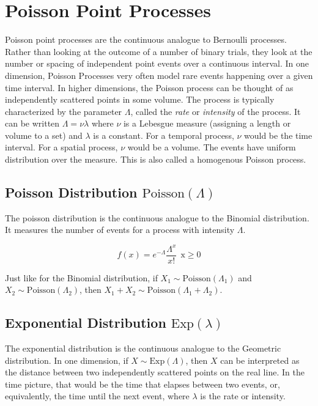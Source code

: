 \section{Poisson Point Processes}
Poisson point processes are the continuous analogue to Bernoulli processes. Rather than looking at the outcome of a number of binary trials, they look at the number or spacing of independent point events over a continuous interval. In one dimension, Poisson Processes very often model rare events happening over a given time interval. In higher dimensions, the Poisson process can be thought of as independently scattered points in some volume. The process is typically characterized by the parameter $\Lambda$, called the \textit{rate} or \textit{intensity} of the process. It can be written $\Lambda = \nu \lambda$ where $\nu$ is a Lebesgue measure (assigning a length or volume to a set) and $\lambda$ is a constant. For a temporal process, $\nu$ would be the time interval. For a spatial process, $\nu$ would be a volume. The events have uniform distribution over the measure. This is also called a homogenous Poisson process. 

\subsection{Poisson Distribution $\mathrm{Poisson}(\Lambda)$}
The poisson distribution is the continuous analogue to the Binomial distribution. It measures the number of events for a process with intensity $\Lambda$.

\begin{equation}
f(x) = e^{-\Lambda}\frac{\Lambda^x}{x!}\ \ \mathrm{x\geq0}
\end{equation}

Just like for the Binomial distribution, if $X_1 \sim \mathrm{Poisson}(\Lambda_1)$ and $X_2 \sim \mathrm{Poisson}(\Lambda_2)$, then $X_1 + X_2 \sim \mathrm{Poisson}(\Lambda_1 + \Lambda_2)$. 


\subsection{Exponential Distribution $\mathrm{Exp}(\lambda)$}
The exponential distribution is the continuous analogue to the Geometric distribution. In one dimension, if $X \sim \mathrm{Exp}(\Lambda)$, then $X$ can be interpreted as the distance between two independently scattered points on the real line. In the time picture, that would be the time that elapses between two events, or, equivalently, the time until the next event, where $\lambda$ is the rate or intensity.

